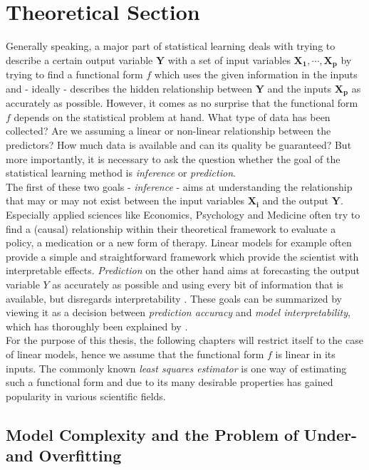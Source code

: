 \documentclass[12pt,a4paper]{article}
\begin{document}
\section{Theoretical Section}\label{sec:theorysuper}
Generally speaking, a major part of statistical learning deals with trying to describe a certain output variable $\mathbf{Y}$ with a set of input variables $\mathbf{X_1}, \cdots, \mathbf{X_p}$ by trying to find a functional form $f$ which uses the given information in the inputs and - ideally - describes the hidden relationship between $\mathbf{Y}$ and the inputs $\mathbf{X_p}$ as accurately as possible. However, it comes as no surprise that the functional form $f$ depends on the statistical problem at hand. What type of data has been collected? Are we assuming a linear or non-linear relationship between the predictors? How much data is available and can its quality be guaranteed? But more importantly, it is necessary to ask the question whether the goal of the statistical learning method is \textit{inference} or \textit{prediction}.\\

The first of these two goals - \textit{inference} - aims at understanding the relationship that may or may not exist between the input variables $\mathbf{X_i}$ and the output $\mathbf{Y}$. Especially applied sciences like Economics, Psychology and Medicine often try to find a (causal) relationship within their theoretical framework to evaluate a policy, a medication or a new form of therapy. Linear models for example often provide a simple and straightforward framework which provide the scientist with interpretable effects. \textit{Prediction} on the other hand aims at forecasting the output variable $Y$ as accurately as possible and using every bit of information that is available, but disregards interpretability \parencite[21]{ESL2009}. These goals can be summarized by viewing it as a decision between \textit{prediction accuracy} and \textit{model interpretability}, which has thoroughly been explained by \textcite{ESL2009}.\\

For the purpose of this thesis, the following chapters will restrict itself to the case of linear models, hence we assume that the functional form $f$ is linear in its inputs. The commonly known \textit{least squares estimator} is one way of estimating such a functional form and due to its many desirable properties has gained popularity in various  scientific fields. 

\subsection{Model Complexity and the Problem of Under- and Overfitting}
\end{document}
